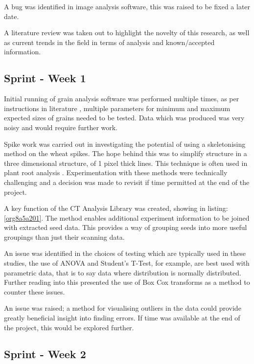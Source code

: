 \documentclass[11pt]{report}
\begin{document}
A bug was identified in image analysis software, this was raised to be fixed a later date.

A literature review was taken out to highlight the novelty of this research, as well as current trends in the field in terms of analysis and known/accepted information.

\subsection{Sprint - Week 1}
\label{sec:org2c3c202}

Initial running of grain analysis software was performed multiple times, as per instructions in literature \cite{Hughes2017}, multiple parameters for minimum and maximum expected sizes of grains needed to be tested. Data which was produced was very noisy and would require further work.

Spike work was carried out in investigating the potential of using a skeletonising method on the wheat spikes. The hope behind this was to simplify structure in a three dimensional structure, of 1 pixel thick lines. This technique is often used in plant root analysis \cite{Mairhofer2015,Daly2017}. Experimentation with these methods were technically challenging and a decision was made to revisit if time permitted at the end of the project.

A key function of the CT Analysis Library was created, showing in listing:\ref{org8a5a201}. The method enables additional experiment information to be joined with extracted seed data. This provides a way of grouping seeds into more useful groupings than just their scanning data.

An issue was identified in the choices of testing which are typically used in these studies, the use of ANOVA and Student's T-Test, for example, are best used with parametric data, that is to say data where distribution is normally distributed. Further reading into this presented the use of Box Cox transforms as a method to counter these issues.

An issue was raised; a method for visualising outliers in the data could provide greatly beneficial insight into finding errors. If time was available at the end of the project, this would be explored further.

\subsection{Sprint - Week 2}
\label{sec:org5046379}
\end{document}

